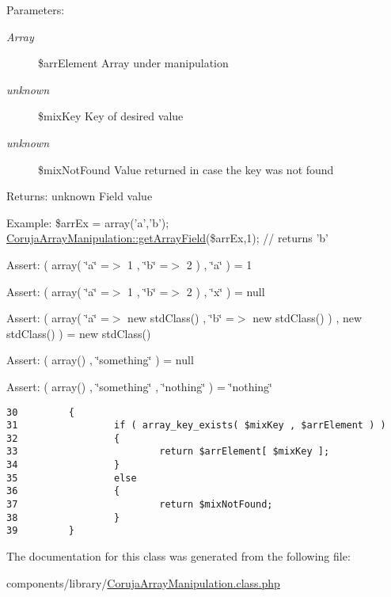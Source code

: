 \begin{Desc}
\item[Parameters:]
\begin{description}
\item[{\em Array}]\$arrElement Array under manipulation \item[{\em unknown}]\$mixKey Key of desired value \item[{\em unknown}]\$mixNotFound Value returned in case the key was not found \end{description}
\end{Desc}
\begin{Desc}
\item[Returns:]unknown Field value \end{Desc}
\begin{Desc}
\item[Example:]\$arrEx = array('a','b'); \hyperlink{class_coruja_array_manipulation_dfbe48ec9869d5b1b6c86d6c85e2141c}{CorujaArrayManipulation::getArrayField}(\$arrEx,1); // returns 'b'\end{Desc}
\begin{Desc}
\item[Assert:]( array( \char`\"{}a\char`\"{} =$>$ 1 , \char`\"{}b\char`\"{} =$>$ 2 ) , \char`\"{}a\char`\"{} ) = 1 \end{Desc}
\begin{Desc}
\item[Assert:]( array( \char`\"{}a\char`\"{} =$>$ 1 , \char`\"{}b\char`\"{} =$>$ 2 ) , \char`\"{}x\char`\"{} ) = null \end{Desc}
\begin{Desc}
\item[Assert:]( array( \char`\"{}a\char`\"{} =$>$ new stdClass() , \char`\"{}b\char`\"{} =$>$ new stdClass() ) , new stdClass() ) = new stdClass() \end{Desc}
\begin{Desc}
\item[Assert:]( array() , \char`\"{}something\char`\"{} ) = null \end{Desc}
\begin{Desc}
\item[Assert:]( array() , \char`\"{}something\char`\"{} , \char`\"{}nothing\char`\"{} ) = \char`\"{}nothing\char`\"{} \end{Desc}


\begin{Code}\begin{verbatim}30         {
31                 if ( array_key_exists( $mixKey , $arrElement ) )
32                 {
33                         return $arrElement[ $mixKey ];
34                 }
35                 else
36                 {
37                         return $mixNotFound;
38                 }
39         }
\end{verbatim}
\end{Code}




The documentation for this class was generated from the following file:\begin{CompactItemize}
\item 
components/library/\hyperlink{_coruja_array_manipulation_8class_8php}{CorujaArrayManipulation.class.php}\end{CompactItemize}
